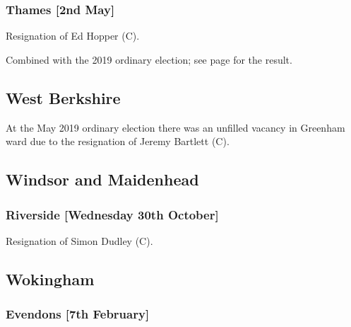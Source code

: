 \documentclass[a4paper,openany]{book}
\begin{document}
\begin{resultsiii}
\subsubsection*{Thames \hspace*{\fill}\nolinebreak[1]%
	\enspace\hspace*{\fill}
	[2nd May]}


Resignation of Ed Hopper (C).

Combined with the 2019 ordinary election; see page \pageref{ThamesReading} for the result.

\subsection*{West Berkshire}

At the May 2019 ordinary election there was an unfilled vacancy in Greenham ward due to the resignation of Jeremy Bartlett (C).

\subsection*{Windsor and Maidenhead}

\subsubsection*{Riverside \hspace*{\fill}\nolinebreak[1]%
	\enspace\hspace*{\fill}
	[Wednesday 30th October]}


Resignation of Simon Dudley (C).

\subsection*{Wokingham}

\subsubsection*{Evendons \hspace*{\fill}\nolinebreak[1]%
	\enspace\hspace*{\fill}
	[7th February]}


\end{resultsiii}
\end{document}
